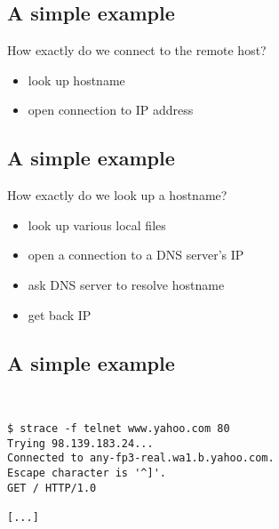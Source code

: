 \documentclass[xga]{xdvislides}
\begin{document}
\subsection{A simple example}
How exactly do we connect to the remote host?
\\
\begin{itemize}
	\item look up hostname
	\item open connection to IP address
\end{itemize}

\subsection{A simple example}
How exactly do we look up a hostname?
\\
\begin{itemize}
	\item look up various local files
	\item open a connection to a DNS server's IP
	\item ask DNS server to resolve hostname
	\item get back IP
\end{itemize}

\subsection{A simple example}
\\
\Hugesize
\begin{center}
\begin{verbatim}
$ strace -f telnet www.yahoo.com 80
Trying 98.139.183.24...
Connected to any-fp3-real.wa1.b.yahoo.com.
Escape character is '^]'.
GET / HTTP/1.0

[...]
\end{verbatim}
\end{center}
\Normalsize
\vspace*{\fill}

%
\end{document}
